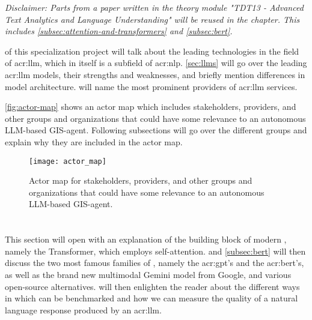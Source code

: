 \textit{Disclaimer: Parts from a paper written in the theory module "TDT13 - Advanced Text Analytics and Language Understanding" will be reused in the  chapter. This includes \autoref{subsec:attention-and-transformers} and \autoref{subsec:bert}.}

\vspace{12pt}

 of this specialization project will talk about the leading technologies in the field of \gls{acr:llm}, which in itself is a subfield of \gls{acr:nlp}. \autoref{sec:llms} will go over the leading \gls{acr:llm} models, their strengths and weaknesses, and briefly mention differences in model architecture.  will name the most prominent providers of \gls{acr:llm} services.

\autoref{fig:actor-map} shows an actor map which includes stakeholders, providers, and other groups and organizations that could have some relevance to an autonomous LLM-based GIS-agent. Following subsections will go over the different groups and explain why they are included in the actor map.

\begin{figure}
    \texttt{[image: actor\_map]}
    \caption{Actor map for stakeholders, providers, and other groups and organizations that could have some relevance to an autonomous LLM-based GIS-agent.}
    \label{fig:actor-map}
\end{figure}



\section[Large Language Models]{}\label{sec:llms}

This section will open with an explanation of the building block of modern , namely the Transformer, which employs self-attention.  and \autoref{subsec:bert} will then discuss the two most famous families of , namely the \acrshort{acr:gpt}'s and the \acrshort{acr:bert}'s, as well as the brand new multimodal Gemini model from Google, and various open-source alternatives.  will then enlighten the reader about the different ways in which  can be benchmarked and how we can measure the quality of a natural language response produced by an \acrshort{acr:llm}.

